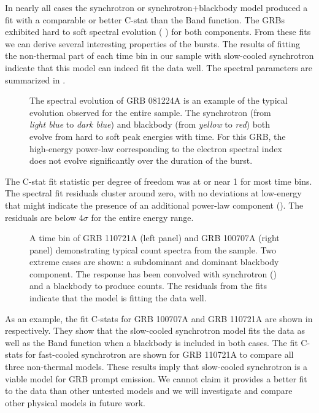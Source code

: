 In nearly all cases the synchrotron or synchrotron+blackbody model
produced a fit with a comparable or better C-stat than the Band
function. The GRBs exhibited hard to soft spectral evolution (
) for both components. From these fits we can
derive several interesting properties of the bursts. The results of
fitting the non-thermal part of each time bin in our sample with
slow-cooled synchrotron indicate that this model can indeed fit the
data well. The spectral parameters are summarized
in .
\begin{figure}[h]

  \centering


 \caption{The spectral evolution of GRB 081224A is an example of the
   typical evolution observed for the entire sample.  The synchrotron
   (from \emph{light blue} to \emph{dark blue}) and blackbody (from
   \emph{yellow} to \emph{red}) both evolve from hard to soft peak
   energies with time. For this GRB, the high-energy power-law
   corresponding to the electron spectral index does not evolve
   significantly over the duration of the burst.}

  \label{fig:specEvo}

\end{figure}
The C-stat fit statistic per degree of freedom was at or
near 1 for most time bins. The spectral fit residuals cluster around
zero, with no deviations at low-energy that might indicate the
presence of an additional power-law component
(). The residuals are below 4$\sigma$ for the
entire energy range. 
\begin{figure}

 \centering






\caption{A time bin of GRB 110721A (left panel) and GRB 100707A (right
  panel) demonstrating typical count spectra from the sample. Two
  extreme cases are shown: a subdominant and dominant blackbody
  component. The response has been convolved with synchrotron
  () and a blackbody to produce counts. The
  residuals from the fits indicate that the model is fitting the data
  well.}

\label{fig:counts}

\end{figure}
As an example, the fit C-stats for GRB 100707A
and GRB 110721A are shown in 
respectively. They show that the slow-cooled synchrotron model fits
the data as well as the Band function when a blackbody is included in
both cases. The fit C-stats for fast-cooled synchrotron are shown for
GRB 110721A to compare all three non-thermal models. These results
imply that slow-cooled synchrotron is a viable model for GRB prompt
emission. We cannot claim it provides a better fit to the data than
other untested models and we will investigate and compare other
physical models in future work.

